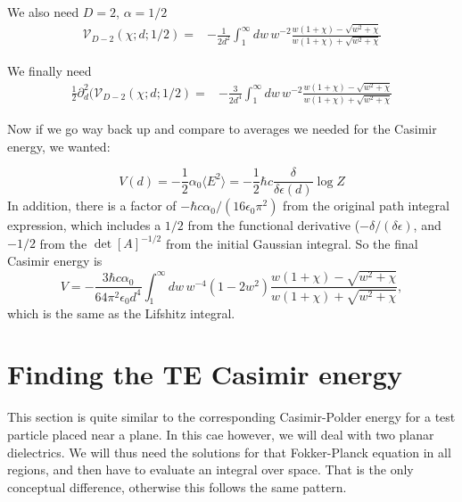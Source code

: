 We also need $D=2$, $\alpha=1/2$
\begin{align}
\mathcal{V}_{D-2}(\chi;d;1/2)%
=&-\frac{1}{2d^2}\int_1^\infty dw\,w^{-2}\frac{w(1+\chi)- \sqrt{w^2 + \chi} }{w (1+\chi)+\sqrt{w^2 + \chi}}
\end{align}

We finally need 
\begin{align}
\frac{1}{2}\partial_d^2(\mathcal{V}_{D-2}(\chi;d;1/2)=
&-\frac{3}{2d^4}\int_1^\infty dw\,w^{-2}\frac{w(1+\chi)- \sqrt{w^2 + \chi} }{w (1+\chi)+\sqrt{w^2 + \chi}}
\end{align}

Now if we go way back up and compare to averages we needed for the Casimir energy, we wanted: 

\begin{equation}
V(d) = -\frac{1}{2}\alpha_0\langle E^2\rangle = -\frac{1}{2}\hbar c\frac{\delta}{\delta\epsilon(d)}\log Z
\end{equation}
In addition, there is a factor of $-\hbar c\alpha_0/(16\epsilon_0\pi^2)$ 
from the original path integral expression, which includes a $1/2$ from the functional derivative 
($-\delta/(\delta\epsilon)$, and $-1/2$ from the $\det[A]^{-1/2}$ from the initial Gaussian integral.  
So the final Casimir energy is 
\begin{equation}
V = -\frac{3\hbar c\alpha_0}{64\pi^2\epsilon_0d^4} \int_1^\infty dw\,w^{-4}(1-2w^2)
\frac{w(1+\chi)- \sqrt{w^2 + \chi} }{w (1+\chi)+\sqrt{w^2 + \chi}},
\end{equation}
which is the same as the Lifshitz integral.  

\section{Finding the TE Casimir energy}

This section is quite similar to the corresponding Casimir-Polder energy for a test particle placed near a plane.
  In this cae however, we will deal with two planar dielectrics.
  We will thus need the solutions for that Fokker-Planck equation in all regions, and then have to evaluate an integral over space.
  That is the only conceptual difference, otherwise this follows the same pattern.  

